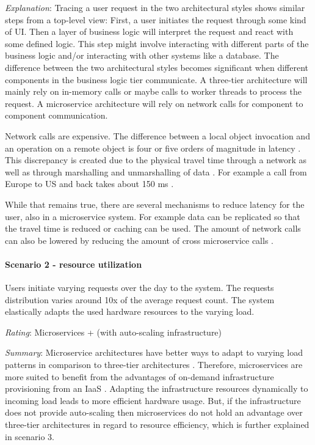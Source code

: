 \textit{Explanation}:
Tracing a user request in the two architectural styles shows similar steps from a top-level view:
First, a user initiates the request through some kind of \ac{UI}. 
Then a layer of business logic will interpret the request and react with some defined logic. 
This step might involve interacting with different parts of the business logic and/or interacting with other systems like a database.
The difference between the two architectural styles becomes significant when different components in the business logic tier communicate.
A three-tier architecture will mainly rely on in-memory calls or maybe calls to worker threads to process the request.
A microservice architecture will rely on network calls for component to component communication.

Network calls are expensive.
The difference between a local object invocation and an operation on a remote object is four or five orders of magnitude in latency  \citep[p. 5]{Kendall1994}.
This discrepancy is created due to the physical travel time through a network as well as through marshalling and unmarshalling of data \citep[p. 32]{Wolff2016}.
For example a call from Europe to US and back takes about 150 ms \cite{Dean2012}.

While that remains true, there are several mechanisms to reduce latency for the user, also in a microservice system. 
For example data can be replicated so that the travel time is reduced or caching can be used.
The amount of network calls can also be lowered by reducing the amount of cross microservice calls \citep[p. 32]{Wolff2016}.

\paragraph{Scenario 2 - resource utilization} Users initiate varying requests over the day to the system. The requests distribution varies around 10x of the average request count. The system elastically adapts the used hardware resources to the varying load.
\label{quaMicro:s2}

\textit{Rating}: Microservices + (with auto-scaling infrastructure)

\textit{Summary}:
Microservice architectures have better ways to adapt to varying load patterns in comparison to three-tier architectures \citep[p. 152f.]{Wolff2016}.
Therefore, microservices are more suited to benefit from the advantages of on-demand infrastructure provisioning from an \ac{IaaS} \citep[p. 12]{Stine2015}.
Adapting the infrastructure resources dynamically to incoming load leads to more efficient hardware usage.
But, if the infrastructure does not provide auto-scaling then microservices do not hold an advantage over three-tier architectures in regard to resource efficiency, which is further explained in scenario 3.

